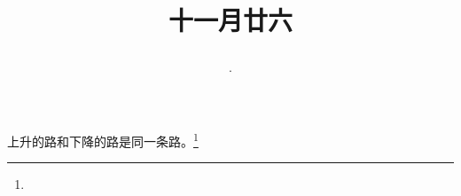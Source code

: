 \title{\date[d=26,m=12,y=2024][year:cn-y,年,month:cn,day:cn,日,·,weekday]·十一月廿六 }
上升的路和下降的路是同一条路。\footnote{ }

